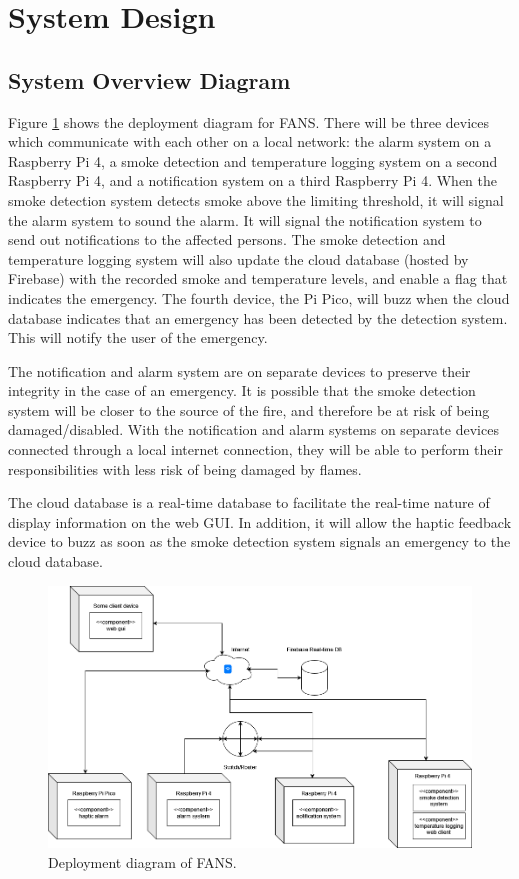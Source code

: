 \section{System Design}

\subsection{System Overview Diagram}

Figure \ref{fig:deployment} shows the deployment diagram for FANS. There will be three devices which communicate with
each other on a local network: the alarm system on a Raspberry Pi 4, a smoke detection and temperature logging system
on a second Raspberry Pi 4, and a notification system on a third Raspberry Pi 4. When the smoke detection system
detects smoke above the limiting threshold, it will signal the alarm system to sound the alarm. It will signal the
notification system to send out notifications to the affected persons. The smoke detection and temperature logging
system will also update the cloud database (hosted by Firebase) with the recorded smoke and temperature levels, and
enable a flag that indicates the emergency. The fourth device, the Pi Pico, will buzz when the cloud database indicates
that an emergency has been detected by the detection system. This will notify the user of the emergency.

The notification and alarm system are on separate devices to preserve their integrity in the case of an emergency. It
is possible that the smoke detection system will be closer to the source of the fire, and therefore be at risk of being
damaged/disabled. With the notification and alarm systems on separate devices connected through a local internet
connection, they will be able to perform their responsibilities with less risk of being damaged by flames.

The cloud database is a real-time database to facilitate the real-time nature of display information on the web GUI. In
addition, it will allow the haptic feedback device to buzz as soon as the smoke detection system signals an emergency
to the cloud database.

\begin{figure}[H]
    \centering
    \includegraphics[width=\linewidth]{../assets/FANSDeployment.png}
    \caption{Deployment diagram of FANS.}
    \label{fig:deployment}
\end{figure}

